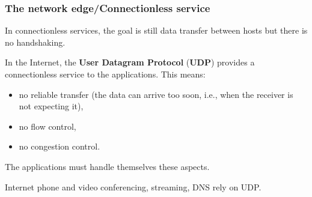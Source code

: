 %
\begin{frame}
\frametitle{The network edge/Connectionless service}

In connectionless services, the goal is still data transfer between
hosts but there is no handshaking.

In the Internet, the \textbf{User Datagram Protocol} (\textbf{UDP})
provides a connectionless service to the applications. This means:

\begin{itemize}

  \item no reliable transfer (the data can arrive too soon, i.e., when
  the receiver is not expecting it),

  \item no flow control,

  \item no congestion control.

\end{itemize}

The applications must handle themselves these aspects. 

Internet phone and video conferencing, streaming, DNS rely on UDP.

\end{frame}
